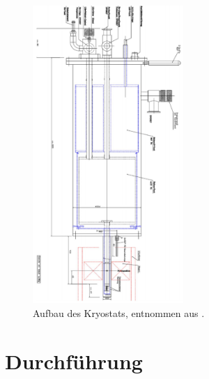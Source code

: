 \documentclass[german,  %
parskip=full,  %
]{scrartcl}
\begin{document}
\begin{figure}[h!]
\centering
\includegraphics[width=0.51\textwidth]{kryo}
\caption{Aufbau des Kryostats, entnommen aus \cite{3}.}
\end{figure}
\newpage
\section{Durchführung}
\end{document}
